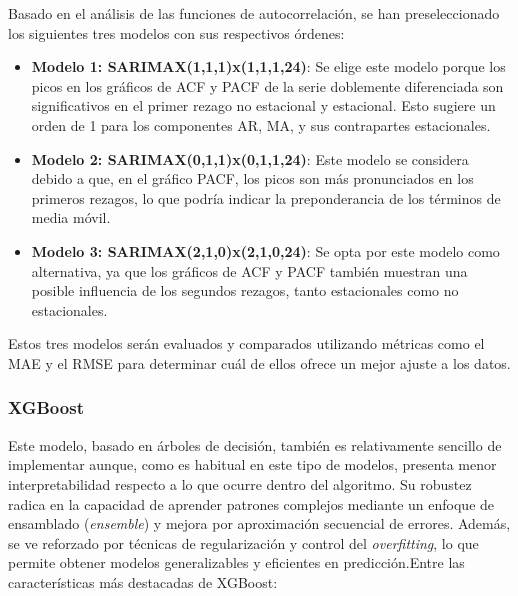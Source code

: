 Basado en el análisis de las funciones de autocorrelación, se han preseleccionado los siguientes tres modelos con sus respectivos órdenes:

\begin{itemize}
    \item \textbf{Modelo 1: SARIMAX(1,1,1)x(1,1,1,24)}:
    Se elige este modelo porque los picos en los gráficos de ACF y PACF de la serie doblemente diferenciada son significativos en el primer rezago no estacional y estacional. Esto sugiere un orden de 1 para los componentes AR, MA, y sus contrapartes estacionales.

    \item \textbf{Modelo 2: SARIMAX(0,1,1)x(0,1,1,24)}:
    Este modelo se considera debido a que, en el gráfico PACF, los picos son más pronunciados en los primeros rezagos, lo que podría indicar la preponderancia de los términos de media móvil.

    \item \textbf{Modelo 3: SARIMAX(2,1,0)x(2,1,0,24)}:
    Se opta por este modelo como alternativa, ya que los gráficos de ACF y PACF también muestran una posible influencia de los segundos rezagos, tanto estacionales como no estacionales.
\end{itemize}

Estos tres modelos serán evaluados y comparados utilizando métricas como el MAE y el RMSE para determinar cuál de ellos ofrece un mejor ajuste a los datos.
%
%
%
\subsubsection{XGBoost}
%
%
%
Este modelo, basado en árboles de decisión, también es relativamente sencillo de implementar aunque, como es habitual en este tipo de modelos, presenta menor interpretabilidad respecto a lo que ocurre dentro del algoritmo. Su robustez radica en la capacidad de aprender patrones complejos mediante un enfoque de ensamblado (\textit{ensemble}) y mejora por aproximación secuencial de errores. Además, se ve reforzado por técnicas de regularización y control del \textit{overfitting}, lo que permite obtener modelos generalizables y eficientes en predicción.Entre las características más destacadas de XGBoost:

